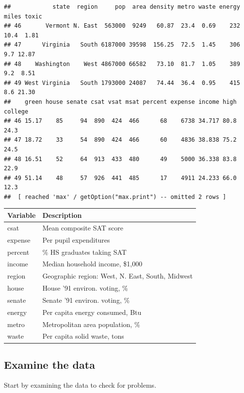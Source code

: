 \documentclass[]{book}
\newenvironment{Shaded}{\begin{snugshade}}{\end{snugshade}}
\newcommand{\CommentTok}[1]{\textcolor[rgb]{0.56,0.35,0.01}{\textit{#1}}}
\newcommand{\KeywordTok}[1]{\textcolor[rgb]{0.13,0.29,0.53}{\textbf{#1}}}
\newcommand{\NormalTok}[1]{#1}
\newcommand{\OperatorTok}[1]{\textcolor[rgb]{0.81,0.36,0.00}{\textbf{#1}}}
\newcommand{\StringTok}[1]{\textcolor[rgb]{0.31,0.60,0.02}{#1}}
\begin{document}
\begin{verbatim}
##            state  region     pop  area density metro waste energy miles toxic
## 46       Vermont N. East  563000  9249   60.87  23.4  0.69    232  10.4  1.81
## 47      Virginia   South 6187000 39598  156.25  72.5  1.45    306   9.7 12.87
## 48    Washington    West 4867000 66582   73.10  81.7  1.05    389   9.2  8.51
## 49 West Virginia   South 1793000 24087   74.44  36.4  0.95    415   8.6 21.30
##    green house senate csat vsat msat percent expense income high college
## 46 15.17    85     94  890  424  466      68    6738 34.717 80.8    24.3
## 47 18.72    33     54  890  424  466      60    4836 38.838 75.2    24.5
## 48 16.51    52     64  913  433  480      49    5000 36.338 83.8    22.9
## 49 51.14    48     57  926  441  485      17    4911 24.233 66.0    12.3
##  [ reached 'max' / getOption("max.print") -- omitted 2 rows ]
\end{verbatim}

\begin{longtable}[]{@{}ll@{}}
\toprule
Variable & Description\tabularnewline
\midrule
\endhead
csat & Mean composite SAT score\tabularnewline
expense & Per pupil expenditures\tabularnewline
percent & \% HS graduates taking SAT\tabularnewline
income & Median household income, \$1,000\tabularnewline
region & Geographic region: West, N. East, South, Midwest\tabularnewline
house & House '91 environ. voting, \%\tabularnewline
senate & Senate '91 environ. voting, \%\tabularnewline
energy & Per capita energy consumed, Btu\tabularnewline
metro & Metropolitan area population, \%\tabularnewline
waste & Per capita solid waste, tons\tabularnewline
\bottomrule
\end{longtable}

\hypertarget{examine-the-data}{%
\subsection{Examine the data}\label{examine-the-data}}

Start by examining the data to check for problems.

\begin{Shaded}
\end{Shaded}
\end{document}
